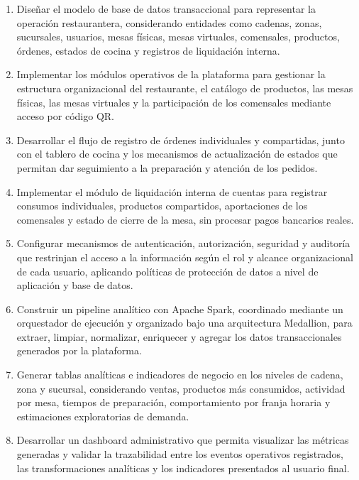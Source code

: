 \begin{enumerate}
    \item Diseñar el modelo de base de datos transaccional para representar la operación
    restaurantera, considerando entidades como cadenas, zonas, sucursales, usuarios,
    mesas físicas, mesas virtuales, comensales, productos, órdenes, estados de cocina y
    registros de liquidación interna.

    \item Implementar los módulos operativos de la plataforma para gestionar la estructura
    organizacional del restaurante, el catálogo de productos, las mesas físicas, las mesas
    virtuales y la participación de los comensales mediante acceso por código QR.

    \item Desarrollar el flujo de registro de órdenes individuales y compartidas, junto con
    el tablero de cocina y los mecanismos de actualización de estados que permitan dar
    seguimiento a la preparación y atención de los pedidos.

    \item Implementar el módulo de liquidación interna de cuentas para registrar consumos
    individuales, productos compartidos, aportaciones de los comensales y estado de cierre
    de la mesa, sin procesar pagos bancarios reales.

    \item Configurar mecanismos de autenticación, autorización, seguridad y auditoría que
    restrinjan el acceso a la información según el rol y alcance organizacional de cada
    usuario, aplicando políticas de protección de datos a nivel de aplicación y base de
    datos.

    \item Construir un pipeline analítico con Apache Spark, coordinado mediante un
    orquestador de ejecución y organizado bajo una arquitectura Medallion, para extraer,
    limpiar, normalizar, enriquecer y agregar los datos transaccionales generados por la
    plataforma.

    \item Generar tablas analíticas e indicadores de negocio en los niveles de cadena,
    zona y sucursal, considerando ventas, productos más consumidos, actividad por mesa,
    tiempos de preparación, comportamiento por franja horaria y estimaciones exploratorias
    de demanda.

    \item Desarrollar un dashboard administrativo que permita visualizar las métricas
    generadas y validar la trazabilidad entre los eventos operativos registrados, las
    transformaciones analíticas y los indicadores presentados al usuario final.
\end{enumerate}

